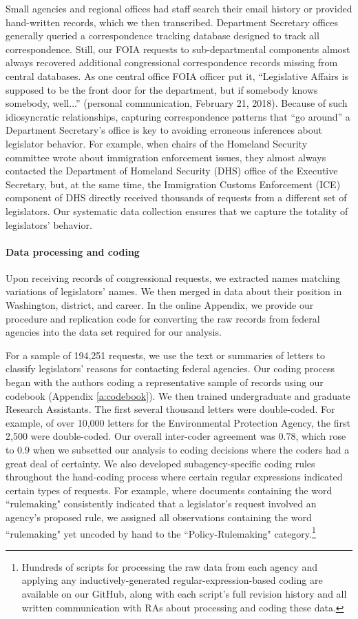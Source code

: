 \documentclass[12pt]{article}
\begin{document}
Small agencies and regional offices had staff search their email history or provided hand-written records, which we then transcribed. Department Secretary offices generally queried a correspondence tracking database designed to track all correspondence. Still, our FOIA requests to sub-departmental components almost always recovered additional congressional correspondence records missing from central databases. As one central office FOIA officer put it, ``Legislative Affairs is supposed to be the front door for the department, but if somebody knows somebody, well...'' (personal communication, February 21, 2018). Because of such idiosyncratic relationships, capturing correspondence patterns that ``go around'' a Department Secretary's office is key to avoiding erroneous inferences about legislator behavior. For example, when chairs of the Homeland Security committee wrote about immigration enforcement issues, they almost always contacted the Department of Homeland Security (DHS) office of the Executive Secretary, but, at the same time, the Immigration Customs Enforcement (ICE) component of DHS directly received thousands of requests from a different set of legislators. Our systematic data collection ensures that we capture the totality of legislators' behavior. 

\paragraph{Data processing and coding} Upon receiving records of congressional requests, we extracted names matching variations of legislators' names. We then merged in data about their position in Washington, district, and career. In the online Appendix, we provide our procedure and replication code for converting the raw records from federal agencies into the data set required for our analysis. 

For a sample of 194,251 requests, we use the text or summaries of letters to classify legislators' reasons for contacting federal agencies.  Our coding process began with the authors coding a representative sample of records using our codebook (Appendix \ref{a:codebook}). We then trained undergraduate and graduate Research Assistants. The first several thousand letters were double-coded. For example, of over 10,000 letters for the Environmental Protection Agency, the first 2,500 were double-coded. Our overall inter-coder agreement was 0.78, which rose to 0.9 when we subsetted our analysis to coding decisions where the coders had a great deal of certainty. We also developed subagency-specific coding rules throughout the hand-coding process where certain regular expressions indicated certain types of requests. For example, where documents containing the word ``rulemaking" consistently indicated that a legislator's request involved an agency's proposed rule, we assigned all observations containing the word ``rulemaking" yet uncoded by hand to the ``Policy-Rulemaking" category.\footnote{Hundreds of scripts for processing the raw data from each agency and applying any inductively-generated regular-expression-based coding are available on our GitHub, along with each script's full revision history and all written communication with RAs about processing and coding these data.}
\end{document}
